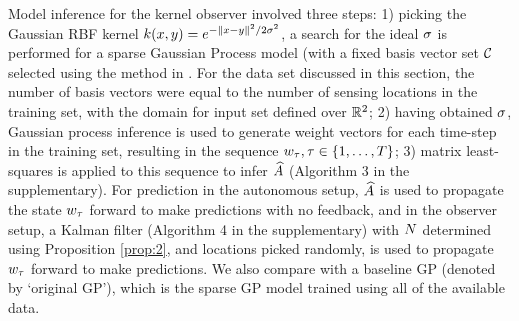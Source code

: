 Model inference for the kernel observer involved three steps: 1) picking the Gaussian RBF kernel $k(x,y) = e^{-\|x-y\|^2/2\sigma^2}$, a search for the ideal $\sigma$ is performed for a sparse Gaussian Process model (with a fixed basis vector set $\mathcal{C}$ selected using the method in \cite{csato2002sparse}. %
{For the data set discussed in this section, the number of basis vectors were equal to the number of sensing locations in the training set, with the domain for input set defined over $ \mathbb{R}^2 $}; 2) having obtained $\sigma$, Gaussian process inference is used to generate weight vectors for each time-step in the training set, resulting in the sequence $w_\tau, \tau\in\{1,\dots,T\}$; 3) matrix least-squares is applied to this sequence to infer $\widehat{A}$ (Algorithm 3 in the supplementary). For prediction in the autonomous setup, $\widehat{A}$ is used to propagate the state $w_{\tau}$ forward to make predictions with no feedback, and in the observer setup, a Kalman filter (Algorithm 4 in the supplementary) with $N$ determined using Proposition \ref{prop:2}, and locations picked randomly, is used to propagate $w_{\tau}$ forward to make predictions. We also compare with a baseline GP (denoted by `original GP'), which is the sparse GP model trained using all of the available data. 

